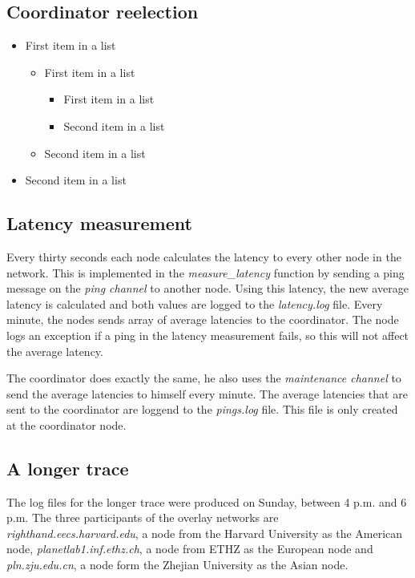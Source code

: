 \documentclass[paper=a4, fontsize=11pt]{scrartcl} %
\numberwithin{equation}{section} %
\numberwithin{figure}{section} %
\numberwithin{table}{section} %
\begin{document}

\subsection{Coordinator reelection}
\begin{itemize}
	\item First item in a list 
		\begin{itemize}
		\item First item in a list 
			\begin{itemize}
			\item First item in a list 
			\item Second item in a list 
			\end{itemize}
		\item Second item in a list 
		\end{itemize}
	\item Second item in a list 
\end{itemize}


\subsection{Latency measurement}

Every thirty seconds each node calculates the latency to every other node in the network. This is implemented in the \textit{measure\_latency} function by sending a ping message on the \textit{ping channel} to another node. Using this latency, the new average latency is calculated and both values are logged to the \textit{latency.log} file. Every minute, the nodes sends array of average latencies to the coordinator. The node logs an exception if a ping in the latency measurement fails, so this will not affect the average latency.

The coordinator does exactly the same, he also uses the \textit{maintenance channel} to send the average latencies to himself every minute. The average latencies that are sent to the coordinator are loggend to the \textit{pings.log} file. This file is only created at the coordinator node.

\subsection{A longer trace}

The log files for the longer trace were produced on Sunday, between 4 p.m. and 6 p.m. The three participants of the overlay networks are \textit{righthand.eecs.harvard.edu}, a node from the Harvard University as the American node, \textit{planetlab1.inf.ethz.ch}, a node from ETHZ as the European node and \textit{pln.zju.edu.cn}, a node form the Zhejian University as the Asian node.

\end{document}
